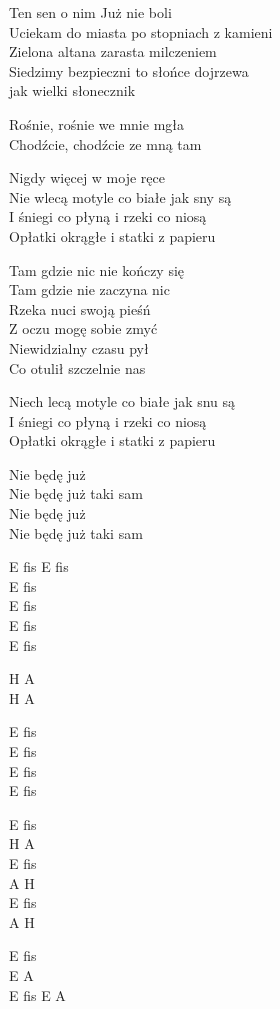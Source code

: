 \begin{text}
    Ten sen o nim Już nie boli\\
    Uciekam do miasta po stopniach z kamieni\\
    Zielona altana zarasta milczeniem\\
    Siedzimy bezpieczni to słońce dojrzewa\\
    jak wielki słonecznik

    Rośnie, rośnie we mnie mgła\\
    Chodźcie, chodźcie ze mną tam

    Nigdy więcej w moje ręce\\
    Nie wlecą motyle co białe jak sny są\\
    I śniegi co płyną i rzeki co niosą\\
    Opłatki okrągłe i statki z papieru

    Tam gdzie nic nie kończy się\\
    Tam gdzie nie zaczyna nic\\
    Rzeka nuci swoją pieśń\\
    Z oczu mogę sobie zmyć\\
    Niewidzialny czasu pył\\
    Co otulił szczelnie nas

    Niech lecą motyle co białe jak snu są\\
    I śniegi co płyną i rzeki co niosą\\
    Opłatki okrągłe i statki z papieru

    Nie będę już\\
    Nie będę już taki sam\\
    Nie będę już\\
    Nie będę już taki sam
\end{text}
\begin{chord}
    E fis E fis\\
    E fis\\
    E fis\\
    E fis\\
    E fis

    H A\\
    H A

    E fis\\
    E fis\\
    E fis\\
    E fis

    E fis\\
    H A\\
    E fis\\
    A H\\
    E fis\\
    A H

    E fis\\
    E A\\
    E fis E A
\end{chord}